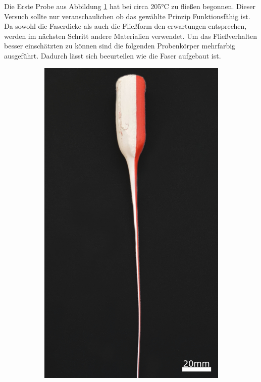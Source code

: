 \begin{figure}[!h]
\begin{minipage}{.5\textwidth}
  \label{fig:probe1}
\end{minipage}
\end{figure}
 Die Erste Probe aus Abbildung \ref{fig:probe1} hat bei circa 205°C zu fließen begonnen. Dieser Versuch sollte nur veranschaulichen ob das gewählte Prinzip Funktionsfähig ist. Da sowohl die Faserdicke als auch die Fließform den erwartungen entsprechen, werden im nächsten Schritt andere Materialien verwendet. Um das Fließverhalten besser einschätzten zu können sind die folgenden Probenkörper mehrfarbig ausgeführt. Dadurch lässt sich beeurteilen wie die Faser aufgebaut ist. \newpage

 \begin{figure}[!h]
     \centering
     \begin{subfigure}[]{.29\textwidth}
         \centering
         \includegraphics[width=\textwidth]{Abbildungen/Versuche/probe3_w.jpg}

\end{subfigure}
\end{figure}
